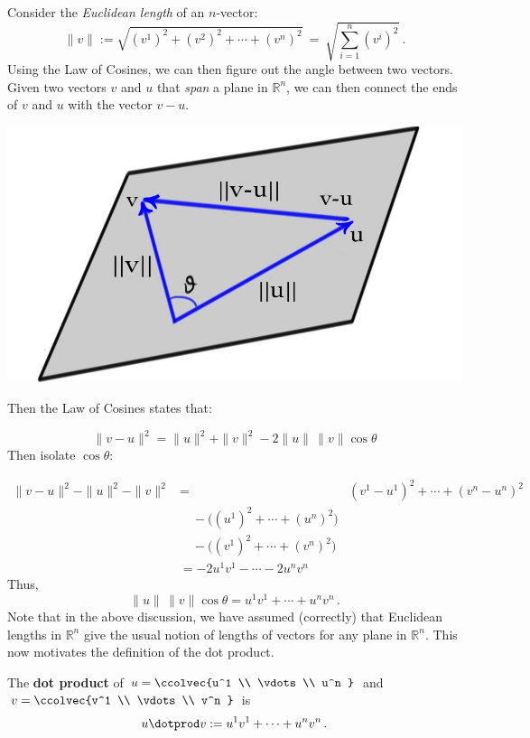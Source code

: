 Consider the {\itshape Euclidean length} of an $n$-vector: 
\[
\|v\| := \sqrt{(v^1)^2 + (v^2)^2+\cdots+(v^n)^2}\ =\ \sqrt{ \sum_{i=1}^n (v^i)^2 }\: .
\]
Using the Law of Cosines, we can then figure out the angle between two vectors.  Given two vectors $v$ and $u$ that {\itshape span} a plane in $\mathbb{R}^n$, we can then connect the ends of $v$ and $u$ with the vector $v-u$. 
 \begin{center}
\includegraphics[scale=.24]{triangleineq.jpg}
\end{center}
Then the Law of Cosines states that:

\[ 
\|v-u\|^2 = \|u\|^2 + \|v\|^2 - 2\|u\|\,  \|v\| \cos \theta 
\]
Then isolate $\cos \theta$:

\begin{align*}
\|v-u\|^2 - \|u\|^2 - \|v\|^2 &=& (v^1-u^1)^2 + \cdots + (v^n-u^n)^2 \\
& \quad - \big((u^1)^2 + \cdots + (u^n)^2\big) \\
& \quad - \big((v^1)^2 + \cdots + (v^n)^2\big) \\
& = -2 u^1v^1 - \cdots - 2u^nv^n
\end{align*}
Thus, 
\[
\|u\|\, \|v\| \cos \theta = u^1v^1 + \cdots + u^nv^n\, .
\]
Note that in the above discussion, we have assumed (correctly) that Euclidean lengths in ${\mathbb R}^n$
give the usual notion of lengths of vectors for any plane in ${\mathbb R}^n$. This now motivates the definition of the dot product.

\begin{definition} 
The {\bfseries dot product} of $u=\ccolvec{u^1 \\ \vdots \\ u^n }$ and $v=\ccolvec{v^1 \\ \vdots \\ v^n }$ is 
\[u\dotprod v := u^1v^1 + \cdots + u^nv^n\, .\]
\end{definition} 

